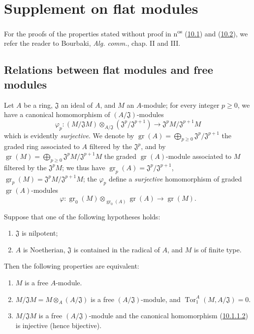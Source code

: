\section{Supplement on flat modules}
\label{section:0.10}

For the proofs of the properties stated without proof in
n\textsuperscript{os} (\hyperref[subsection:0.10.1]{10.1}) and
(\hyperref[subsection:0.10.2]{10.2}), we refer the reader to Bourbaki,
\emph{Alg. comm.}, chap. II and III.

\subsection{Relations between flat modules and free modules}
\label{subsection:0.10.1}

\begin{env}[10.1.1]
\label{0.10.1.1}
Let $A$ be a ring, $\mathfrak{J}$ an ideal of $A$, and $M$ an $A$-module; for
every integer $p\geq0$, we have a canonical homomorphism of
$(A/\mathfrak{J})$-modules
\[
\label{0.10.1.1.1}
  \varphi_p:(M/\mathfrak{J}M)\otimes_{A/\mathfrak{J}}
  (\mathfrak{J}^p/\mathfrak{J}^{p+1})
  \longrightarrow \mathfrak{J}^pM/\mathfrak{J}^{p+1}M
  \tag{10.1.1.1}
\]
which is evidently \emph{surjective}. We denote by
$\operatorname{gr}(A)=\bigoplus_{p\geq0}\mathfrak{J}^p/\mathfrak{J}^{p+1}$ the graded ring
associated to $A$ filtered by the $\mathfrak{J}^p$, and by
$\operatorname{gr}(M)=\bigoplus_{p\geq0}\mathfrak{J}^pM/\mathfrak{J}^{p+1}M$ the graded
$\operatorname{gr}(A)$-module associated to $M$ filtered by the $\mathfrak{J}^pM$; we
thus have $\operatorname{gr}_p(A)=\mathfrak{J}^p/\mathfrak{J}^{p+1}$,
$\operatorname{gr}_p(M)=\mathfrak{J}^pM/\mathfrak{J}^{p+1}M$; the $\varphi_p$ define
a \emph{surjective} homomorphism of graded $\operatorname{gr}(A)$-modules
\[
\label{0.10.1.1.2}
  \varphi:\operatorname{gr}_0(M)\otimes_{\operatorname{gr}_0(A)}
  \operatorname{gr}(A)\longrightarrow\operatorname{gr}(M).
  \tag{10.1.1.2}
\]
\end{env}

\begin{env}[10.1.2]
\label{0.10.1.2}
Suppose that one of the following hypotheses holds:
\begin{enumerate}
  \item[(i)] $\mathfrak{J}$ is nilpotent;
  \item[(ii)] $A$ is Noetherian, $\mathfrak{J}$ is contained in the radical of
    $A$, and $M$ is of finite type.
\end{enumerate}
Then the following properties are equivalent:
\begin{enumerate}
  \item[$a)$] $M$ is a free $A$-module.
  \item[$b)$] $M/\mathfrak{J}M=M\otimes_A(A/\mathfrak{J})$ is a free
    $(A/\mathfrak{J})$-module, and
    $\operatorname{Tor}_1^A(M,A/\mathfrak{J})=0$.
  \item[$c)$] $M/\mathfrak{J}M$ is a free $(A/\mathfrak{J})$-module and
    the canonical homomorphism (\hyperref[0.10.1.1.2]{10.1.1.2}) is
    injective (hence bijective).
\end{enumerate}
\end{env}

